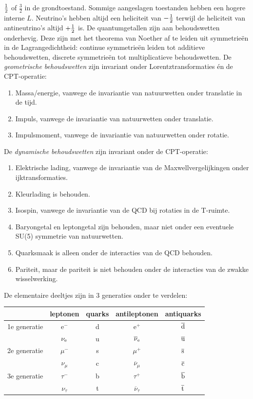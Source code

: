 \documentclass[twoside]{report}
\begin{document}
$\mbox{$\frac{1}{2}$}$ of $\frac{3}{2}$ in de grondtoestand. Sommige aangeslagen toestanden
hebben een hogere interne $L$. Neutrino's hebben altijd een heliciteit van
$-\mbox{$\frac{1}{2}$}$ terwijl de heliciteit van antineutrino's altijd $+\mbox{$\frac{1}{2}$}$ is.
\npar
De quantumgetallen zijn aan behoudswetten onderhevig. Deze zijn met het
theorema van Noether af te leiden uit symmetrie\"en in de Lagrangedichtheid:
continue symmetrie\"en leiden tot additieve behoudswetten, discrete
symmetrie\"en tot multiplicatieve behoudswetten.
\npar
De {\it geometrische behoudswetten} zijn invariant onder Lorentztransformaties
\'en de CPT-operatie:
\begin{enumerate}
\setlength{\itemsep}{0mm}
\item Massa/energie, vanwege de invariantie van natuurwetten onder translatie in de tijd.
\item Impuls, vanwege de invariantie van natuurwetten onder translatie.
\item Impulsmoment, vanwege de invariantie van natuurwetten onder rotatie.
\end{enumerate}
De {\it dynamische behoudswetten} zijn invariant onder de CPT-operatie:
\begin{enumerate}
\setlength{\itemsep}{0mm}
\item Elektrische lading, vanwege de invariantie van de Maxwellvergelijkingen
      onder ijktransformaties.
\item Kleurlading is behouden.
\item Isospin, vanwege de invariantie van de QCD bij rotaties in de T-ruimte.
\item Baryongetal en leptongetal zijn behouden, maar niet onder een eventuele
      SU(5) symmetrie van natuurwetten.
\item Quarksmaak is alleen onder de interacties van de QCD behouden.
\item Pariteit, maar de pariteit is niet behouden onder de interacties van
      de zwakke wisselwerking.
\end{enumerate}
De elementaire deeltjes zijn in 3 generaties onder te verdelen:
\begin{center}
\begin{tabular}{||l|c|c|c|c||}
\hline
&leptonen&quarks&antileptonen&antiquarks\\
\hline
1e generatie&e$^-$ &d&e$^+$&$\overline{\rm d}$\rule{0pt}{12pt}\\
 &$\nu_{\rm e}$&u&$\overline{\nu}_{\rm e}$&$\overline{\rm u}$\\
\hline
2e generatie&$\mu^-$ &s&$\mu^+$&$\overline{\rm s}$\rule{0pt}{12pt}\\
 &$\nu_\mu$&c&$\overline{\nu}_\mu$&$\overline{\rm c}$\\
\hline
3e generatie&$\tau^-$ &b&$\tau^+$&$\overline{\rm b}$\rule{0pt}{12pt}\\
 &$\nu_\tau$&t&$\overline{\nu}_\tau$&$\overline{\rm t}$\\
\hline
\end{tabular}
\end{center}
\end{document}
